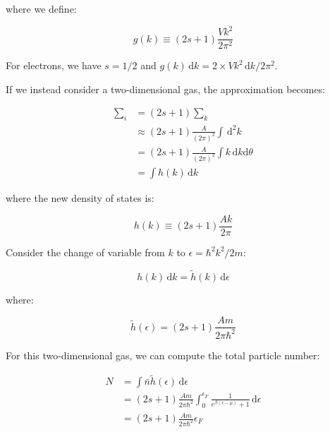 \documentclass[12pt]{article}
\begin{document}
where we define:

\begin{equation}
    g(k) \equiv (2s + 1) \frac{Vk^{2}}{2\pi^{2}}
\end{equation}

For electrons, we have $s = 1/2$ and $g(k) \, \mathrm{d}k = 2 \times Vk^{2} \, \mathrm{d}k / 2\pi^{2}$.

If we instead consider a two-dimensional gas, the approximation becomes:

\begin{equation}
    \begin{split}
        \sum_{i} &= (2s + 1) \sum_{k} \\
        &\approx (2s + 1) \frac{A}{(2\pi)^{2}} \int \, \mathrm{d}^{2}k \\
        &= (2s + 1) \frac{A}{(2\pi)^{2}} \int k \, \mathrm{d}k \mathrm{d}\theta \\
        &= \int h(k) \, \mathrm{d}k
    \end{split}
\end{equation}

where the new density of states is:

\begin{equation}
    h(k) \equiv (2s + 1) \frac{Ak}{2\pi}
\end{equation}

Consider the change of variable from $k$ to $\epsilon = \hbar^{2} k^{2}/2m$:

\begin{equation}
    h(k) \, \mathrm{d}k = \tilde{h}(k) \, \mathrm{d}\epsilon
\end{equation}

where:

\begin{equation}
    \tilde{h}(\epsilon) = (2s + 1) \frac{Am}{2\pi\hbar^{2}}
\end{equation}

For this two-dimensional gas, we can compute the total particle number:

\begin{equation}
    \begin{split}
        N &= \int \bar{n} \tilde{h}(\epsilon) \, \mathrm{d}\epsilon \\
        &= (2s + 1) \frac{Am}{2\pi\hbar^{2}} \int_{0}^{\epsilon_{F}} \frac{1}{e^{\beta (\epsilon - \mu)} + 1} \, \mathrm{d}\epsilon \\
        &= (2s + 1) \frac{Am}{2\pi\hbar^{2}} \epsilon_{F}
    \end{split}
\end{equation}
\end{document}
